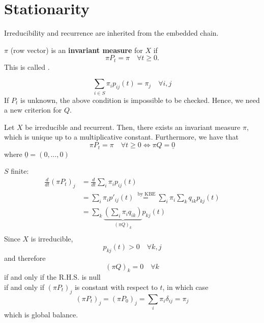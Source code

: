 \documentclass{article}
\begin{document}
\section{Stationarity}
Irreducibility and recurrence are inherited from the embedded chain. 
\begin{definition}
	$\pi$ (row vector) is an \textbf{invariant measure} for $X$ if 
	\begin{equation*}
		\pi P_t = \pi \quad \forall t \geq 0.
	\end{equation*}
	This is called .
\end{definition}

\begin{equation*}
	\sum_{i \in S} \pi_i p_{ij}(t) = \pi_j \quad \forall i, j
\end{equation*}
If $P_t$ is unknown, the above condition is impossible to be checked. Hence, we need a new criterion for $Q$. 
\begin{proposition}
		Let $X$ be irreducible and recurrent. Then, there exists an invariant measure $\pi$, which is unique up to a multiplicative constant. Furthermore, we have that 
	\begin{equation*}
		\pi P_t = \pi \quad \forall t \geq  0 \iff \pi Q = \underline{0}
	\end{equation*}
	where $\underline{0} = (0, \ldots,0)$
\end{proposition}
\begin{proof2}
		$S$ finite:
	\begin{align*}
		\frac{d}{dt} (\pi  P_t)_j &= \frac{d}{dt} \sum_i \pi_i p_{ij}(t) \\
		&= \sum_i \pi_i p'_{ij}(t) \stackrel{\text{ by KBE}} =  \sum_i \pi_i \sum_{k} q_{ik} p_{kj}(t) \\
		&= \sum_{k} \underbrace{(\sum_i \pi_i q_{ik})}_{(\pi Q)_k} p_{kj}(t) \\ 
	\end{align*}
	Since $X$ is irreducible, 
	\begin{equation*}
		p_{kj}(t) > 0 \quad \forall k,j
	\end{equation*}
	and therefore
	\begin{equation*}
		(\pi Q)_k = 0 \quad \forall k 
	\end{equation*}
	if and only if the R.H.S. is null \\
	if and only if 
	$(\pi P_t)_j$
	is constant with respect to $t$, in which case 
	\begin{equation*}
		(\pi P_t)_j = (\pi P_0)_j = \sum_i \pi_i \delta_{ij} = \pi_j
	\end{equation*}
	which is global balance.   
\end{proof2}
\end{document}
